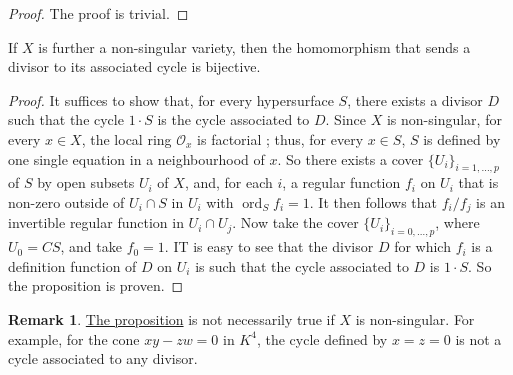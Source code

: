 \documentclass{article}
\theoremstyle{plain}
\newenvironment{proposition}[1]
    {\renewcommand\theinnercustomproposition{#1}\innercustomproposition}
    {\endinnercustomproposition}
\theoremstyle{definition}
\newtheorem*{remark}{Remark}
\newcommand{\sh}{\mathscr}
\DeclareMathOperator{\ord}{ord}
\newcommand{\oldpage}[1]{\marginpar{\footnotesize$\Big\vert$ \textit{p.~#1}}}
\begin{document}
\begin{proof}
  The proof is trivial.
\end{proof}

\begin{proposition}{10}
\label{proposition10}
  If $X$ is further a non-singular variety, then the homomorphism that sends a divisor to its associated cycle is bijective.
\end{proposition}

\oldpage{4-09}
\begin{proof}
  It suffices to show that, for every hypersurface $S$, there exists a divisor $D$ such that the cycle $1\cdot S$ is the cycle associated to $D$.
  Since $X$ is non-singular, for every $x\in X$, the local ring $\sh{O}_x$ is factorial \cite{3};
  thus, for every $x\in S$, $S$ is defined by one single equation in a neighbourhood of $x$.
  So there exists a cover $\{U_i\}_{i=1,\ldots,p}$ of $S$ by open subsets $U_i$ of $X$, and, for each $i$, a regular function $f_i$ on $U_i$ that is non-zero outside of $U_i\cap S$ in $U_i$ with $\ord_S f_i=1$.
  It then follows that $f_i/f_j$ is an invertible regular function in $U_i\cap U_j$.
  Now take the cover $\{U_i\}_{i=0,\ldots,p}$, where $U_0=CS$, and take $f_0=1$.
  IT is easy to see that the divisor $D$ for which $f_i$ is a definition function of $D$ on $U_i$ is such that the cycle associated to $D$ is $1\cdot S$.
  So the proposition is proven.
\end{proof}

\begin{remark}
  \hyperref[proposition10]{The proposition} is not necessarily true if $X$ is non-singular.
  For example, for the cone $xy-zw=0$ in $K^4$, the cycle defined by $x=z=0$ is not a cycle associated to any divisor.
\end{remark}



\nocite{*}
\end{document}

